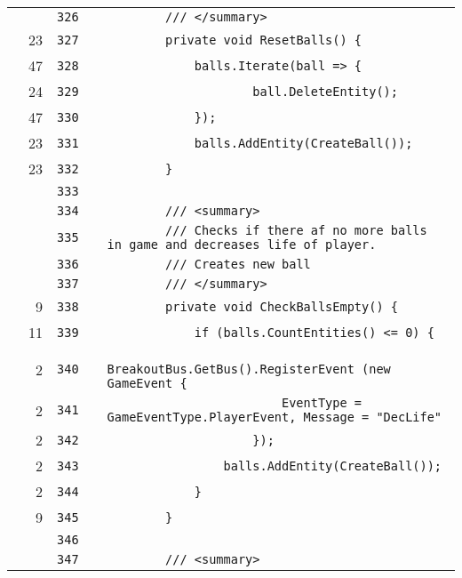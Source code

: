 \documentclass[a4paper,landscape,10pt]{article}
\begin{document}
\begin{longtable}[l]{lrrll}
\cellcolor{gray} &  & \verb~326~ & & \verb~        /// </summary>~\\
\cellcolor{green} & 23 & \verb~327~ & & \verb~        private void ResetBalls() {~\\
\cellcolor{green} & 47 & \verb~328~ & & \verb~            balls.Iterate(ball => {~\\
\cellcolor{green} & 24 & \verb~329~ & & \verb~                    ball.DeleteEntity();~\\
\cellcolor{green} & 47 & \verb~330~ & & \verb~            });~\\
\cellcolor{green} & 23 & \verb~331~ & & \verb~            balls.AddEntity(CreateBall());~\\
\cellcolor{green} & 23 & \verb~332~ & & \verb~        }~\\
\cellcolor{gray} &  & \verb~333~ & & \verb~~\\
\cellcolor{gray} &  & \verb~334~ & & \verb~        /// <summary>~\\
\cellcolor{gray} &  & \verb~335~ & & \verb~        /// Checks if there af no more balls in game and decreases life of player.~\\
\cellcolor{gray} &  & \verb~336~ & & \verb~        /// Creates new ball~\\
\cellcolor{gray} &  & \verb~337~ & & \verb~        /// </summary>~\\
\cellcolor{green} & 9 & \verb~338~ & & \verb~        private void CheckBallsEmpty() {~\\
\cellcolor{green} & 11 & \verb~339~ & & \verb~            if (balls.CountEntities() <= 0) {~\\
\cellcolor{green} & 2 & \verb~340~ & & \verb~                BreakoutBus.GetBus().RegisterEvent (new GameEvent {~\\
\cellcolor{green} & 2 & \verb~341~ & & \verb~                        EventType = GameEventType.PlayerEvent, Message = "DecLife"~\\
\cellcolor{green} & 2 & \verb~342~ & & \verb~                    });~\\
\cellcolor{green} & 2 & \verb~343~ & & \verb~                balls.AddEntity(CreateBall());~\\
\cellcolor{green} & 2 & \verb~344~ & & \verb~            }~\\
\cellcolor{green} & 9 & \verb~345~ & & \verb~        }~\\
\cellcolor{gray} &  & \verb~346~ & & \verb~~\\
\cellcolor{gray} &  & \verb~347~ & & \verb~        /// <summary>~\\

\end{longtable}
\end{document}
